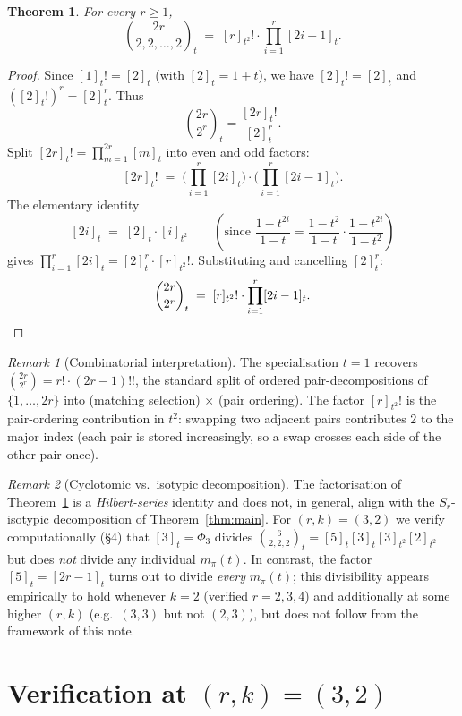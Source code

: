\documentclass[11pt]{article}
\newtheorem{theorem}{Theorem}
\theoremstyle{definition}
\theoremstyle{remark}
\newtheorem*{remark}{Remark}
\begin{document}
\begin{theorem}\label{thm:cyclotomic}
For every $r \ge 1$,
\[
\binom{2r}{2, 2, \ldots, 2}_t \;=\; [r]_{t^2}! \cdot \prod_{i=1}^{r} [2i-1]_t.
\]
\end{theorem}

\begin{proof}
Since $[1]_t! = [2]_t$ (with $[2]_t = 1+t$), we have $[2]_t! = [2]_t$
and $([2]_t!)^r = [2]_t^r$. Thus
\[
\binom{2r}{2^r}_t = \frac{[2r]_t!}{[2]_t^r}.
\]
Split $[2r]_t! = \prod_{m=1}^{2r} [m]_t$ into even and odd factors:
\[
[2r]_t! \;=\; \Big(\prod_{i=1}^{r} [2i]_t\Big) \cdot \Big(\prod_{i=1}^{r} [2i-1]_t\Big).
\]
The elementary identity
\[
[2i]_t \;=\; [2]_t \cdot [i]_{t^2}
\qquad
\left(\text{since } \frac{1-t^{2i}}{1-t} = \frac{1-t^2}{1-t} \cdot \frac{1-t^{2i}}{1-t^2}\right)
\]
gives $\prod_{i=1}^r [2i]_t = [2]_t^r \cdot [r]_{t^2}!$. Substituting
and cancelling $[2]_t^r$:
\[
\binom{2r}{2^r}_t \;=\; [r]_{t^2}! \cdot \prod_{i=1}^{r} [2i-1]_t. \qedhere
\]
\end{proof}

\begin{remark}[Combinatorial interpretation]
The specialisation $t = 1$ recovers $\binom{2r}{2^r} = r! \cdot (2r-1)!!$,
the standard split of ordered pair-decompositions of $\{1,\ldots,2r\}$
into (matching selection) $\times$ (pair ordering). The factor
$[r]_{t^2}!$ is the pair-ordering contribution in $t^2$: swapping two
adjacent pairs contributes $2$ to the major index (each pair is stored
increasingly, so a swap crosses each side of the other pair once).
\end{remark}

\begin{remark}[Cyclotomic vs.\ isotypic decomposition]
The factorisation of Theorem~\ref{thm:cyclotomic} is a \emph{Hilbert-series}
identity and does not, in general, align with the $S_r$-isotypic
decomposition of Theorem~\ref{thm:main}. For $(r, k) = (3, 2)$ we verify
computationally (\S 4) that $[3]_t = \Phi_3$ divides
$\binom{6}{2,2,2}_t = [5]_t [3]_t [3]_{t^2} [2]_{t^2}$ but does
\emph{not} divide any individual $m_\pi(t)$. In contrast, the factor
$[5]_t = [2r-1]_t$ turns out to divide \emph{every} $m_\pi(t)$; this
divisibility appears empirically to hold whenever $k = 2$ (verified
$r = 2, 3, 4$) and additionally at some higher $(r, k)$ (e.g.\ $(3,3)$
but not $(2,3)$), but does not follow from the framework of this note.
\end{remark}

\section{Verification at $(r, k) = (3, 2)$}
\end{document}
